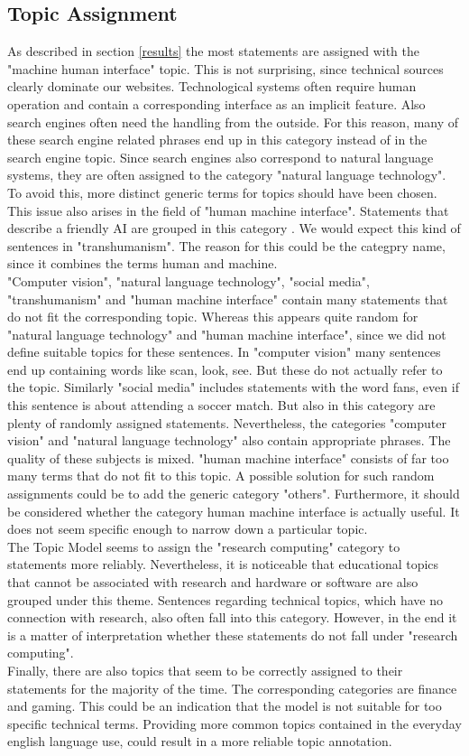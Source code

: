 \subsection{Topic Assignment}
\label{topics}
As described in section \ref{results} the most statements are assigned with the "machine human interface" topic.
This is not surprising, since technical sources clearly dominate our websites. 
Technological systems often require human operation and contain a corresponding interface as an implicit feature.
Also search engines often need the handling from the outside. 
For this reason, many of these search engine related phrases end up in this category instead of in the search engine topic.
Since search engines also correspond to natural language systems, they are often assigned to the category "natural language technology".
To avoid this, more distinct generic terms for topics should have been chosen.
This issue also arises in the field of "human machine interface". 
Statements that describe a friendly AI are grouped in this category . 
We would expect this kind of sentences in "transhumanism".
The reason for this could be the categpry name, since it combines the terms human and machine.
\\
"Computer vision", "natural language technology", "social media", "transhumanism" and "human machine interface" contain many statements that do not fit the corresponding topic.
Whereas this appears quite random for "natural language technology" and "human machine interface", since we did not define suitable topics for these sentences.
In "computer vision" many sentences end up containing words like scan, look, see.
But these do not actually refer to the topic.
Similarly "social media" includes  statements with the word fans, even if this sentence is about attending a soccer match.
But also in this category are plenty of randomly assigned statements.
Nevertheless, the categories "computer vision" and "natural language technology" also contain appropriate phrases.  
The quality of these subjects is mixed.
"human machine interface" consists of far too many terms that do not fit to this topic. 
A possible solution for such random assignments could be to add the generic category "others".
Furthermore, it should be considered whether the category human machine interface is actually useful.
It does not seem specific enough to narrow down a particular topic.
\\
The Topic Model seems to assign the "research computing" category to statements more reliably.
Nevertheless, it is noticeable that educational topics that cannot be associated with research and hardware or software are also grouped under this theme.
Sentences regarding technical topics, which have no connection with research, also often fall into this category.
However, in the end it is a matter of interpretation whether these statements do not fall under "research computing".
\\
Finally, there are also topics that seem to be correctly assigned to their statements for the majority of the time.
The corresponding categories are finance and gaming.
This could be an indication that the model is not suitable for too specific technical terms.
Providing more common topics contained in the everyday english language use, could result in a more reliable topic annotation.
